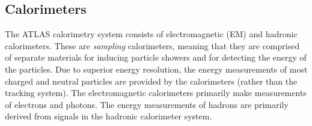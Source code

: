 \subsection{Calorimeters}
%
The ATLAS calorimetry system consists of electromagnetic (EM) and hadronic calorimeters. These are \textit{sampling} calorimeters, meaning that they are comprised of separate materials for inducing particle showers and for detecting the energy of the particles. Due to superior energy resolution, the energy measurements of most charged and neutral particles are provided by the calorimeters (rather than the tracking system). The electromagnetic calorimeters primarily make measurements of electrons and photons. The energy measurements of hadrons are primarily derived from signals in the hadronic calorimeter system.%
